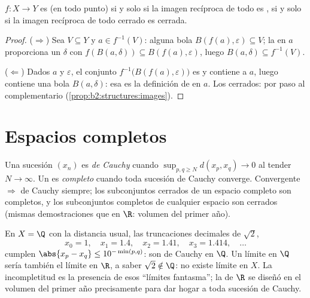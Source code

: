 \begin{theorem}\label{thm:b2:metric:globalcontinuity}
$f \colon X \to Y$ es  (en todo punto) si y solo si la imagen
recíproca de todo  es , si y solo si la imagen
recíproca de todo cerrado es cerrada.
\end{theorem}

\begin{proof}
($\Rightarrow$) Sea $V \subseteq Y$  y $a \in f^{-1}(V)$:
alguna bola $B(f(a), \varepsilon) \subseteq V$; la  en $a$
proporciona un $\delta$ con $f(B(a, \delta)) \subseteq B(f(a),
\varepsilon)$, luego $B(a, \delta) \subseteq f^{-1}(V)$.

($\Leftarrow$) Dados $a$ y $\varepsilon$, el conjunto
$f^{-1}\bigl(B(f(a), \varepsilon)\bigr)$ es  y contiene a $a$,
luego contiene una bola $B(a, \delta)$: esa es la definición de
 en $a$. Los cerrados: por paso al complementario
(\cref{prop:b2:structures:images}).
\end{proof}

\section{Espacios completos}

\begin{definition}\label{def:b2:metric:complete}
Una sucesión $(x_n)$ es \emph{de Cauchy} cuando $\sup_{p, q \geq N}
d(x_p, x_q) \to 0$ al tender $N \to \infty$. Un  es
\emph{completo} cuando toda sucesión
de Cauchy converge. Convergente $\Rightarrow$ de Cauchy siempre; los
subconjuntos cerrados de un espacio completo son completos, y los
subconjuntos completos de cualquier espacio son cerrados (mismas
demostraciones que en $\R$: volumen del primer año).
\end{definition}

\begin{example}\label{ex:b2:metric:cauchynolimit}
En $X = \Q$ con la distancia usual, las truncaciones decimales de
$\sqrt2$,
\[
x_0 = 1,\quad x_1 = 1.4,\quad x_2 = 1.41,\quad x_3 = 1.414,
\quad\dots
\]
cumplen $\abs{x_p - x_q} \leq 10^{-\min(p,q)}$: son de Cauchy en
$\Q$. Un límite en $\Q$ sería también el límite en $\R$, a saber
$\sqrt2 \notin \Q$: no existe límite en $X$. La incompletitud es la
presencia de esos ``límites fantasma''; la  de $\R$ se
diseñó en el volumen del primer año precisamente para dar hogar a
toda sucesión de Cauchy.
\end{example}

